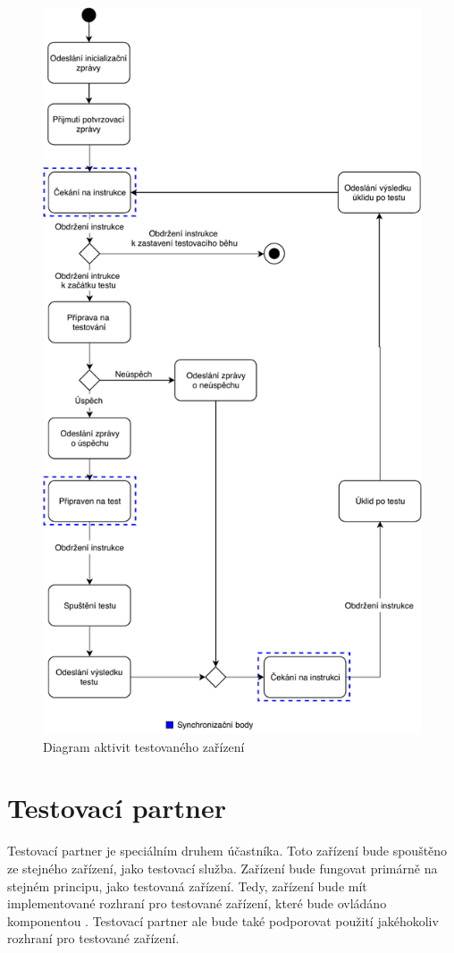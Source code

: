 \begin{figure}
    \centering 
    \includegraphics[height=0.98\textheight]{assets/img/activitydiagramdevice.pdf}
    \caption{Diagram aktivit testovaného zařízení}
    \label{fig:act_diag_device}
\end{figure}


\section{Testovací partner}
Testovací partner je speciálním druhem účastníka. Toto zařízení bude spouštěno ze stejného zařízení, jako testovací služba. Zařízení bude fungovat primárně na stejném principu, jako testovaná zařízení. Tedy, zařízení bude mít implementované rozhraní pro testované zařízení, které bude ovládáno komponentou . Testovací partner ale bude také podporovat použití jakéhokoliv rozhraní pro testované zařízení. 

